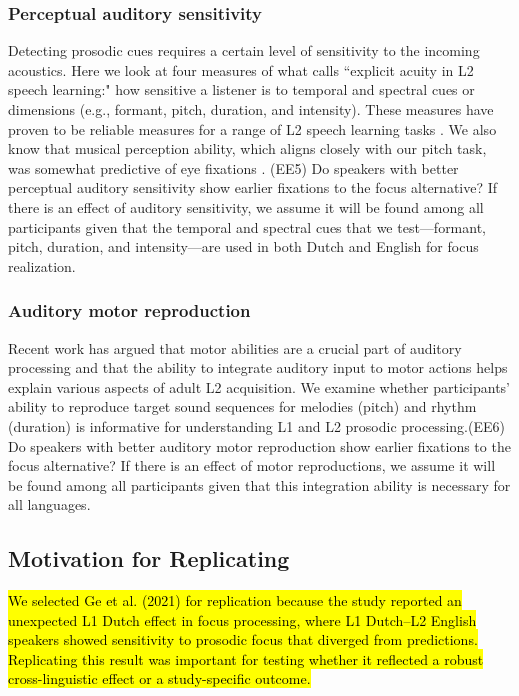 \subsubsection{Perceptual auditory sensitivity}
Detecting prosodic cues requires a certain level of sensitivity to the incoming acoustics. Here we look at four measures of what \cite{saito2023does} calls ``explicit acuity in L2 speech learning:" how sensitive a listener is to temporal and spectral cues or dimensions (e.g., formant,
pitch, duration, and intensity). These measures have proven to be reliable measures for a range of L2 speech learning tasks \parencite{Kachlicka_Saito_Tierney_2019, saito2024auditory, bakkouche2025effects, bramlett_wiener_24_speechprosody}. We also know that musical perception ability, which aligns closely with our pitch task, was somewhat predictive of eye fixations \cite{jansen2023influence}. (EE5) Do speakers with better perceptual auditory sensitivity show earlier fixations to the focus alternative? If there is an effect of auditory sensitivity, we assume it will be found among all participants given that the temporal and spectral cues  that we test---formant, pitch, duration, and intensity---are used in both Dutch and English for focus realization.


\subsubsection{Auditory motor reproduction}
Recent work \parencite{tierney2014auditory, saito2024auditory,tierney2017individual} has argued that motor abilities are a crucial part of auditory processing and that the ability to integrate auditory input to motor actions helps explain various aspects of adult L2 acquisition. We examine whether participants' ability to reproduce target sound sequences for melodies (pitch) and rhythm (duration) is informative for understanding L1 and L2 prosodic processing.(EE6) Do speakers with better auditory motor reproduction show earlier fixations to the focus alternative? If there is an effect of motor reproductions, we assume it will be found among all participants given that this integration ability is necessary for all languages.

\subsection{Motivation for Replicating \cite{ge2021a}}

\hl{We selected Ge et al. (2021) for replication because the study reported an unexpected L1 Dutch effect in focus processing, where L1 Dutch–L2 English speakers showed sensitivity to prosodic focus that diverged from predictions. Replicating this result was important for testing whether it reflected a robust cross-linguistic effect or a study-specific outcome.}

